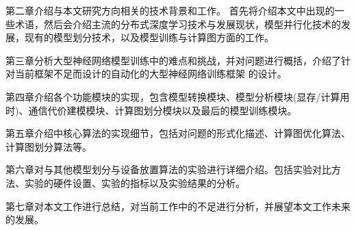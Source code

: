 第二章介绍与本文研究方向相关的技术背景和工作。
首先将介绍本文中出现的一些术语，然后会介绍主流的分布式深度学习技术与发展现状，模型并行化技术的发展，现有的模型划分技术，以及模型训练与计算图方面的工作。

第三章分析大型神经网络模型训练中的难点和挑战，并对问题进行概括，介绍了针对当前框架不足而设计的自动化的大型神经网络训练框架\sys{} 的设计。

第四章介绍\sys 各个功能模块的实现，包含模型转换模块、模型分析模块(显存/计算用时)、通信代价建模模块、计算图划分模块以及最后的模型训练模块。

第五章介绍\sys 中核心算法的实现细节，包括对问题的形式化描述、计算图优化算法、计算图划分算法等。

第六章对\sys 与其他模型划分与设备放置算法的实验进行详细介绍。包括实验对比方法、实验的硬件设置、实验的指标以及实验结果的分析。

第七章对本文工作进行总结，对当前工作中的不足进行分析，并展望本文工作未来的发展。